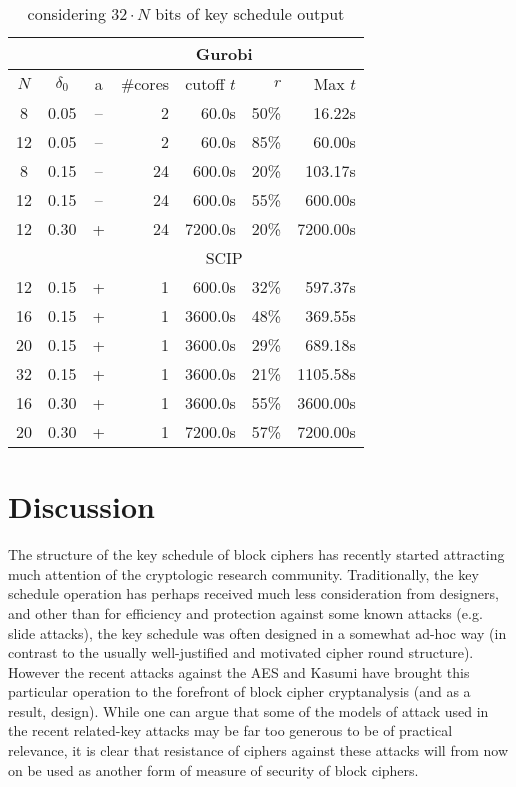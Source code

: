 \begin{table}[htbp]
\begin{center}
\begin{tabular}{|c|c| c|r|r|r|r|}
\hline
 & & \multicolumn{5}{c|}{Gurobi}\\
\hline
$N$ & $\delta_0$ & a & \#cores & cutoff $t$ & $r$ & Max $t$\\
\hline
 8 & 0.05 & -- &  2 &   60.0s & 50\% &  16.22s\\
12 & 0.05 & -- &  2 &   60.0s & 85\% &  60.00s\\ 
\hline
 8 & 0.15 & -- & 24 &  600.0s & 20\% &  103.17s\\ 
12 & 0.15 & -- & 24 &  600.0s & 55\% &  600.00s\\ 
\hline
12 & 0.30 &  + & 24 & 7200.0s & 20\% & 7200.00s\\
\hline
\hline
 & & \multicolumn{5}{c|}{SCIP}\\ 
\hline
12 & 0.15 &  + & 1 &  600.0s & 32\% &  597.37s\\ %
16 & 0.15 &  + & 1 & 3600.0s & 48\% &  369.55s\\ %
20 & 0.15 &  + & 1 & 3600.0s & 29\% &  689.18s\\ %
32 & 0.15 &  + & 1 & 3600.0s & 21\% & 1105.58s\\ %
\hline
16 & 0.30 &  + & 1 & 3600.0s & 55\% & 3600.00s\\ %
20 & 0.30 &  + & 1 & 7200.0s & 57\% & 7200.00s\\ %
\hline
\end{tabular}
\end{center}
\caption{\Serpent considering $32 \cdot N$ bits of key schedule output}
\label{tab:serpent}
\end{table}


\section{Discussion}
\label{sec:conclusion}

The structure of the key schedule of block ciphers has recently started attracting much attention of the cryptologic research community. Traditionally, the key schedule operation has perhaps received much less consideration from designers, and other than for efficiency and protection against some known attacks (e.g. slide attacks),  the key schedule was often designed in a somewhat ad-hoc way (in contrast to the usually well-justified and motivated cipher round structure).  However the recent attacks against the AES and Kasumi have brought this particular operation to the forefront of block cipher cryptanalysis (and as a result, design). While one can argue that some of the models of attack used in the recent related-key attacks may be far too generous to be of practical relevance, it is clear that resistance of ciphers against these attacks will from now on be used as another form of measure of security of block ciphers.

